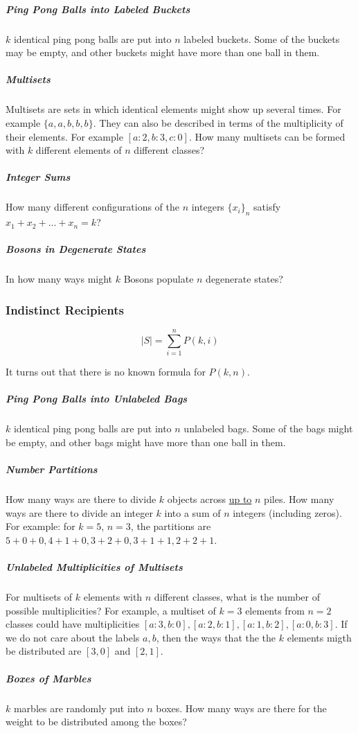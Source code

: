 \subparagraph{Ping Pong Balls into Labeled Buckets} $k$ identical ping pong balls are put into $n$ labeled buckets. Some of the buckets may be empty, and other buckets might have more than one ball in them.  

\subparagraph{Multisets} Multisets are sets in which identical elements might show up several times. For example $\{a,a,b,b,b\}$. They can also be described in terms of the multiplicity of their elements. For example $[a:2, b:3, c:0]$. How many multisets can be formed with $k$ different elements of $n$ different classes?

\subparagraph{Integer Sums} How many different configurations of the $n$ integers $\{ x_i\}_n$ satisfy $x_1 + x_2 + ... + x_n = k$?

\subparagraph{Bosons in Degenerate States} In how many ways might $k$ Bosons populate $n$ degenerate states?

\subsubsection{Indistinct Recipients}

\begin{equation}
|S| = \sum_{i=1}^n P(k,i)
\end{equation}

It turns out that there is no known formula for $P(k,n)$.

\subparagraph{Ping Pong Balls into Unlabeled Bags} $k$ identical ping pong balls are put into $n$ unlabeled bags. Some of the bags might be empty, and other bags might have more than one ball in them.

\subparagraph{Number Partitions} How many ways are there to divide $k$ objects across \underline{up to} $n$ piles. How many ways are there to divide an integer $k$ into a sum of $n$ integers (including zeros). For example: for $k=5$, $n=3$, the partitions are $5+0+0, 4+1+0, 3+2+0, 3+1+1, 2+2+1$.

\subparagraph{Unlabeled Multiplicities of Multisets} For multisets of $k$ elements with $n$ different classes, what is the number of possible multiplicities? For example, a multiset of $k=3$ elements from $n=2$ classes could have multiplicities $[a:3,b:0], [a:2,b:1],[a:1,b:2],[a:0,b:3]$. If we do not care about the labels $a,b$, then the ways that the the $k$ elements migth be distributed are $[3,0]$ and $[2,1]$.

\subparagraph{Boxes of Marbles} $k$ marbles are randomly put into $n$ boxes. How many ways are there for the weight to be distributed among the boxes?



